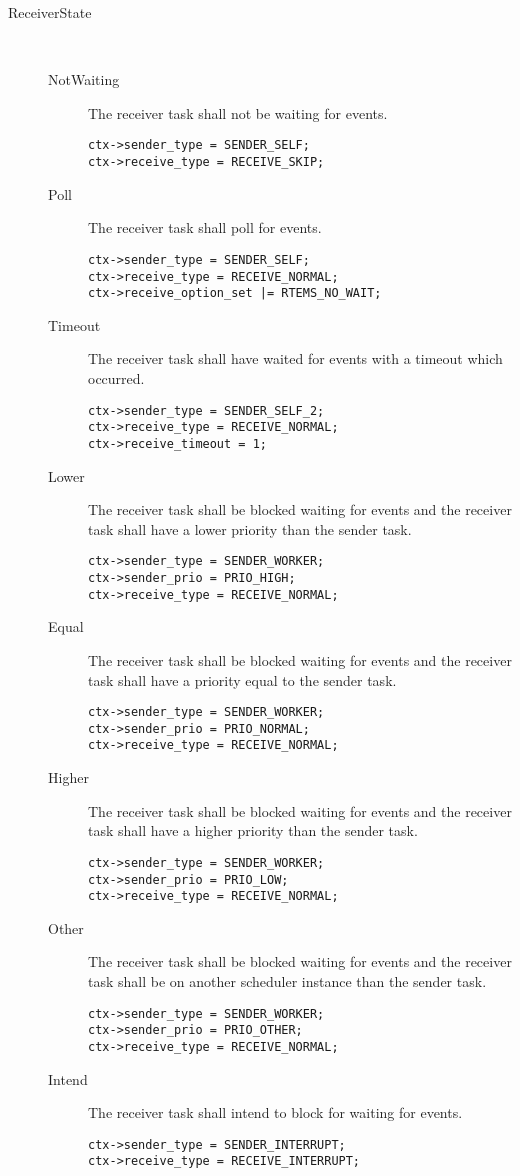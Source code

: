 \begin{description}
  \item[ReceiverState]~
  \begin{description}
  \item[NotWaiting]
    The receiver task shall not be waiting for events.
\begin{verbatim}
ctx->sender_type = SENDER_SELF;
ctx->receive_type = RECEIVE_SKIP;
\end{verbatim}
  \item[Poll]
    The receiver task shall poll for events.
\begin{verbatim}
ctx->sender_type = SENDER_SELF;
ctx->receive_type = RECEIVE_NORMAL;
ctx->receive_option_set |= RTEMS_NO_WAIT;
\end{verbatim}
  \item[Timeout]
    The receiver task shall have waited for events with a timeout which
occurred.
\begin{verbatim}
ctx->sender_type = SENDER_SELF_2;
ctx->receive_type = RECEIVE_NORMAL;
ctx->receive_timeout = 1;
\end{verbatim}
  \item[Lower]
    The receiver task shall be blocked waiting for events and the receiver
task shall have a lower priority than the sender task.
\begin{verbatim}
ctx->sender_type = SENDER_WORKER;
ctx->sender_prio = PRIO_HIGH;
ctx->receive_type = RECEIVE_NORMAL;
\end{verbatim}
  \item[Equal]
    The receiver task shall be blocked waiting for events and the receiver
task shall have a priority equal to the sender task.
\begin{verbatim}
ctx->sender_type = SENDER_WORKER;
ctx->sender_prio = PRIO_NORMAL;
ctx->receive_type = RECEIVE_NORMAL;
\end{verbatim}
  \item[Higher]
    The receiver task shall be blocked waiting for events and the receiver
task shall have a higher priority than the sender task.
\begin{verbatim}
ctx->sender_type = SENDER_WORKER;
ctx->sender_prio = PRIO_LOW;
ctx->receive_type = RECEIVE_NORMAL;
\end{verbatim}
  \item[Other]
    The receiver task shall be blocked waiting for events and the receiver
task shall be on another scheduler instance than the sender task.
\begin{verbatim}
ctx->sender_type = SENDER_WORKER;
ctx->sender_prio = PRIO_OTHER;
ctx->receive_type = RECEIVE_NORMAL;
\end{verbatim}
  \item[Intend]
    The receiver task shall intend to block for waiting for events.
\begin{verbatim}
ctx->sender_type = SENDER_INTERRUPT;
ctx->receive_type = RECEIVE_INTERRUPT;
\end{verbatim}
  \end{description}


\end{description}
